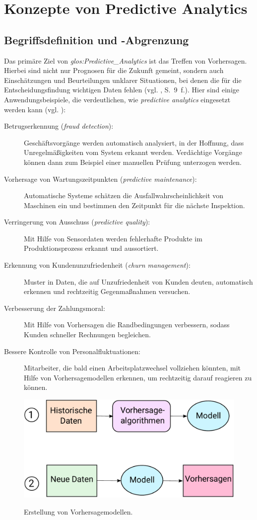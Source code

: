\chapter{Konzepte von Predictive Analytics}
\label{part:Konzepte_PA}

\section{Begriffsdefinition und -Abgrenzung}

Das primäre Ziel von \emph{\gls{glos:Predictive_Analytics}} ist das Treffen von
Vorhersagen.
Hierbei sind nicht nur Prognosen für die Zukunft gemeint, sondern
auch Einschätzungen und Beurteilungen unklarer Situationen, bei denen die für
die Entscheidungsfindung wichtigen Daten fehlen (vgl. \cite{Dinov}, S.~9~f.).
Hier sind einige Anwendungsbeispiele, die verdeutlichen, wie \emph{predictive
analytics} eingesetzt werden kann (vgl. \cite{Schmitz}):
\begin{description}
\item[Betrugserkennung (\emph{fraud detection}):] Geschäftsvorgänge werden
automatisch analysiert, in der Hoffnung, dass Unregelmäßigkeiten vom System
erkannt werden. Verdächtige Vorgänge können dann zum Beispiel einer manuellen
Prüfung unterzogen werden.
\item[Vorhersage von Wartungszeitpunkten (\emph{predictive maintenance}):]
Automatische Systeme schätzen die Ausfallwahrscheinlichkeit von Maschinen ein
und bestimmen den Zeitpunkt für die nächste Inspektion.
\item[Verringerung von Ausschuss (\emph{predictive quality}):]
Mit Hilfe von Sensordaten werden fehlerhafte Produkte im Produktionsprozess
erkannt und aussortiert.
\item[Erkennung von Kundenunzufriedenheit (\emph{churn management}):]
Muster in Daten, die auf Unzufriedenheit von Kunden deuten, automatisch erkennen
und rechtzeitig Gegenmaßnahmen versuchen.
\item[Verbesserung der Zahlungsmoral:]
Mit Hilfe von Vorhersagen die Randbedingungen verbessern, sodass Kunden
schneller Rechnungen begleichen.
\item[Bessere Kontrolle von Personalfluktuationen:]
Mitarbeiter, die bald einen Arbeitsplatzwechsel vollziehen könnten, mit Hilfe
von Vorhersagemodellen erkennen, um rechtzeitig darauf reagieren zu können.
\end{description}
\begin{figure}%
\centering
\caption{Erstellung von Vorhersagemodellen.}
\includegraphics[scale=0.8]{Grafiken/PA_Ink.pdf} 
\label{pic:PA}
\end{figure}
